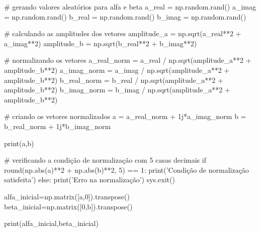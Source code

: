 \begin{pycode}
    # gerando valores aleatórios para alfa e beta
		a_real = np.random.rand()
		a_imag = np.random.rand()
		b_real = np.random.rand()
		b_imag = np.random.rand()

	# calculando as amplitudes dos vetores
		amplitude_a = np.sqrt(a_real**2 + a_imag**2)
		amplitude_b = np.sqrt(b_real**2 + b_imag**2)

	# normalizando os vetores
		a_real_norm = a_real / np.sqrt(amplitude_a**2 + amplitude_b**2)
		a_imag_norm = a_imag / np.sqrt(amplitude_a**2 + amplitude_b**2)
		b_real_norm = b_real / np.sqrt(amplitude_a**2 + amplitude_b**2)
		b_imag_norm = b_imag / np.sqrt(amplitude_a**2 + amplitude_b**2)

	# criando os vetores normalizados
		a = a_real_norm + 1j*a_imag_norm
		b = b_real_norm + 1j*b_imag_norm

	print(a,b)

	# verificando a condição de normalização com 5 casas decimais
		if  round(np.abs(a)**2 + np.abs(b)**2, 5) == 1:
  		  print('Condição de normalização satisfeita')
		else:
    		print('Erro na normalização')
   		 sys.exit()

	alfa_inicial=np.matrix([a,0]).transpose()
	beta_inicial=np.matrix([0,b]).transpose()

	print(alfa_inicial,beta_inicial)
\end{pycode}

